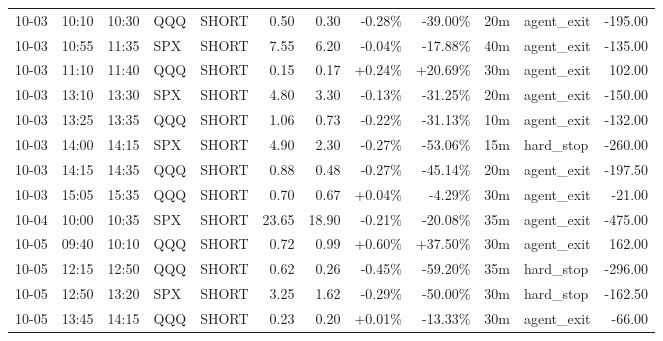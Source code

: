 \documentclass[11pt,a4paper,twoside]{article}
\begin{document}
\begin{center}
\begin{longtable}{>{\color{txtmain}}l l l l l r r r r r >{\color{txtmain}}l r}
10-03 & 10:10 & 10:30 & QQQ & SHORT & 0.50 & 0.30 & \textcolor{lossred}{-0.28\%} & \textcolor{lossred}{-39.00\%} & 20m & agent\_exit & \textcolor{lossred}{-195.00} \\
10-03 & 10:55 & 11:35 & SPX & SHORT & 7.55 & 6.20 & \textcolor{lossred}{-0.04\%} & \textcolor{lossred}{-17.88\%} & 40m & agent\_exit & \textcolor{lossred}{-135.00} \\
10-03 & 11:10 & 11:40 & QQQ & SHORT & 0.15 & 0.17 & \textcolor{wingreen}{+0.24\%} & \textcolor{wingreen}{+20.69\%} & 30m & agent\_exit & \textcolor{wingreen}{102.00} \\
10-03 & 13:10 & 13:30 & SPX & SHORT & 4.80 & 3.30 & \textcolor{lossred}{-0.13\%} & \textcolor{lossred}{-31.25\%} & 20m & agent\_exit & \textcolor{lossred}{-150.00} \\
10-03 & 13:25 & 13:35 & QQQ & SHORT & 1.06 & 0.73 & \textcolor{lossred}{-0.22\%} & \textcolor{lossred}{-31.13\%} & 10m & agent\_exit & \textcolor{lossred}{-132.00} \\
10-03 & 14:00 & 14:15 & SPX & SHORT & 4.90 & 2.30 & \textcolor{lossred}{-0.27\%} & \textcolor{lossred}{-53.06\%} & 15m & hard\_stop & \textcolor{lossred}{-260.00} \\
10-03 & 14:15 & 14:35 & QQQ & SHORT & 0.88 & 0.48 & \textcolor{lossred}{-0.27\%} & \textcolor{lossred}{-45.14\%} & 20m & agent\_exit & \textcolor{lossred}{-197.50} \\
10-03 & 15:05 & 15:35 & QQQ & SHORT & 0.70 & 0.67 & \textcolor{wingreen}{+0.04\%} & \textcolor{lossred}{-4.29\%} & 30m & agent\_exit & \textcolor{lossred}{-21.00} \\
10-04 & 10:00 & 10:35 & SPX & SHORT & 23.65 & 18.90 & \textcolor{lossred}{-0.21\%} & \textcolor{lossred}{-20.08\%} & 35m & agent\_exit & \textcolor{lossred}{-475.00} \\
10-05 & 09:40 & 10:10 & QQQ & SHORT & 0.72 & 0.99 & \textcolor{wingreen}{+0.60\%} & \textcolor{wingreen}{+37.50\%} & 30m & agent\_exit & \textcolor{wingreen}{162.00} \\
10-05 & 12:15 & 12:50 & QQQ & SHORT & 0.62 & 0.26 & \textcolor{lossred}{-0.45\%} & \textcolor{lossred}{-59.20\%} & 35m & hard\_stop & \textcolor{lossred}{-296.00} \\
10-05 & 12:50 & 13:20 & SPX & SHORT & 3.25 & 1.62 & \textcolor{lossred}{-0.29\%} & \textcolor{lossred}{-50.00\%} & 30m & hard\_stop & \textcolor{lossred}{-162.50} \\
10-05 & 13:45 & 14:15 & QQQ & SHORT & 0.23 & 0.20 & \textcolor{wingreen}{+0.01\%} & \textcolor{lossred}{-13.33\%} & 30m & agent\_exit & \textcolor{lossred}{-66.00} \\

\end{longtable}
\end{center}
\end{document}
